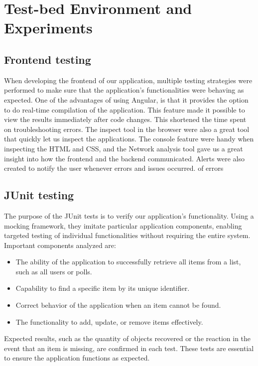 \section{Test-bed Environment and Experiments}
\label{sec:evaluation}

\subsection{Frontend testing}
When developing the frontend of our application, multiple testing strategies were performed to make sure that the 
application's functionalities were behaving as expected. One of the advantages of using Angular, is that it provides 
the option to do real-time compilation of the application. This feature made it possible to view the results immediately 
after code changes. This shortened the time spent on troubleshooting errors. The inspect tool in the browser were 
also a great tool that quickly let us inspect the applications. The console feature were handy when inspecting the 
HTML and CSS, and the Network analysis tool gave us a great insight into how the frontend and the backend 
communicated. Alerts were also created to notify the user whenever errors and issues occurred. 
of errors 

\subsection{JUnit testing}
The purpose of the JUnit tests is to verify our application's functionality. Using a mocking framework, they imitate particular application components, enabling targeted testing of individual functionalities without requiring the entire system. Important components analyzed are:

\begin{itemize}
    \item The ability of the application to successfully retrieve all items from a list, such as all users or polls.
    \item Capability to find a specific item by its unique identifier.
    \item Correct behavior of the application when an item cannot be found.
    \item The functionality to add, update, or remove items effectively.
\end{itemize}

Expected results, such as the quantity of objects recovered or the reaction in the event that an item is missing, are confirmed in each test. These tests are essential to ensure the application functions as expected.

